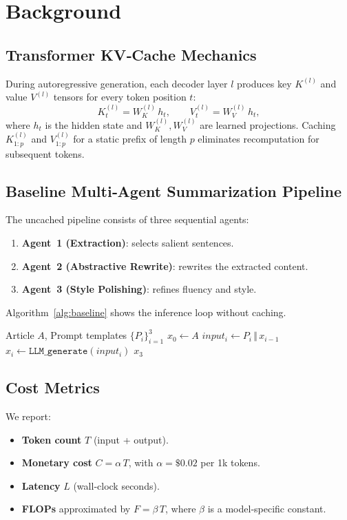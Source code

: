 \documentclass[10pt,conference]{IEEEtran}
\begin{document}
\section{Background}
\label{sec:background}
\subsection{Transformer KV‑Cache Mechanics}
During autoregressive generation, each decoder layer $l$ produces key $K^{(l)}$ and value $V^{(l)}$ tensors for every token position $t$:
\begin{equation}
K^{(l)}_{t} = W^{(l)}_{K} \, h_{t}, \qquad
V^{(l)}_{t} = W^{(l)}_{V} \, h_{t},
\end{equation}
where $h_{t}$ is the hidden state and $W^{(l)}_{K},W^{(l)}_{V}$ are learned projections. Caching $K^{(l)}_{1:p}$ and $V^{(l)}_{1:p}$ for a static prefix of length $p$ eliminates recomputation for subsequent tokens.

\subsection{Baseline Multi‑Agent Summarization Pipeline}
The uncached pipeline consists of three sequential agents:
\begin{enumerate}
    \item \textbf{Agent~1 (Extraction)}: selects salient sentences.
    \item \textbf{Agent~2 (Abstractive Rewrite)}: rewrites the extracted content.
    \item \textbf{Agent~3 (Style Polishing)}: refines fluency and style.
\end{enumerate}
Algorithm~\ref{alg:baseline} shows the inference loop without caching.

\begin{algorithm}[H]
\caption{Baseline Multi‑Agent Inference (No Caching)}\label{alg:baseline}
\begin{algorithmic}[1]
\Require Article $A$, Prompt templates $\{P_i\}_{i=1}^{3}$
\State $x_0 \gets A$
    \State $input_i \gets P_i \,\Vert\, x_{i-1}$
    \State $x_i \gets \texttt{LLM\_generate}(input_i)$
\EndFor
\State \Return $x_3$
\end{algorithmic}
\end{algorithm}

\subsection{Cost Metrics}
We report:
\begin{itemize}
    \item \textbf{Token count} $T$ (input + output).
    \item \textbf{Monetary cost} $C = \alpha \, T$, with $\alpha = \$0.02$ per 1k tokens.
    \item \textbf{Latency} $L$ (wall‑clock seconds).
    \item \textbf{FLOPs} approximated by $F = \beta \, T$, where $\beta$ is a model‑specific constant.
\end{itemize}
\end{document}
